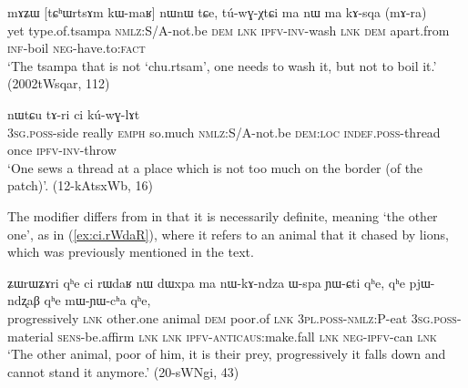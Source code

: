 
\begin{exe}
\ex \label{ex:tChWrtsAm.kWmaR}
\gll mɤʑɯ [tɕʰɯrtsɤm kɯ-maʁ] nɯnɯ tɕe, tú-wɣ-χtɕi ma nɯ ma kɤ-sqa (mɤ-ra) \\
yet type.of.tsampa \textsc{nmlz}:S/A-not.be \textsc{dem} \textsc{lnk} \textsc{ipfv}-\textsc{inv}-wash \textsc{lnk} \textsc{dem} apart.from \textsc{inf}-boil \textsc{neg}-have.to:\textsc{fact} \\
\glt `The tsampa that is not `chu.rtsam', one needs to wash it, but not to boil it.' (2002tWsqar, 112)
\end{exe}

\begin{exe}
\ex \label{ex:sthWci.kWmaR}
 nɯtɕu tɤ-ri ci kú-wɣ-lɤt \\
\textsc{3sg}.\textsc{poss}-side really \textsc{emph} so.much \textsc{nmlz}:S/A-not.be \textsc{dem}:\textsc{loc} \textsc{indef}.\textsc{poss}-thread once \textsc{ipfv}-\textsc{inv}-throw \\
\glt `One sews a thread at a place which is not too much on the border (of the patch)'. (12-kAtsxWb, 16)
\end{exe}

The modifier  differs from  in that it is necessarily definite, meaning `the other one', as in (\ref{ex:ci.rWdaR}), where it refers to an animal that it chased by lions, which was previously mentioned in the text.

\begin{exe}
\ex \label{ex:ci.rWdaR}
\gll ʑɯrɯʑɤri qʰe ci rɯdaʁ nɯ dɯxpa ma nɯ-kɤ-ndza ɯ-spa ɲɯ-ɕti qʰe, qʰe pjɯ-ndʐaβ qʰe mɯ-ɲɯ-cʰa qʰe, \\
progressively \textsc{lnk} other.one animal \textsc{dem} poor.of \textsc{lnk} \textsc{3pl}.\textsc{poss}-\textsc{nmlz}:P-eat \textsc{3sg}.\textsc{poss}-material \textsc{sens}-be.affirm \textsc{lnk} \textsc{lnk} \textsc{ipfv}-\textsc{anticaus}:make.fall \textsc{lnk} \textsc{neg}-\textsc{ipfv}-can \textsc{lnk} \\
\glt `The other animal, poor of him, it is their prey, progressively it falls down and cannot stand it anymore.' (20-sWNgi, 43)
\end{exe}

